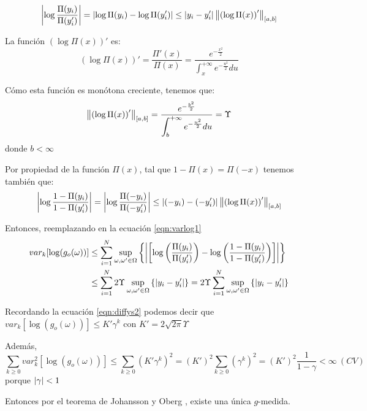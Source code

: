 \begin{equation}
    \left|\log \frac{\Pi(y_i)}{\Pi(y_i')}\right| = \left|\log \Pi(y_i)  -\log \Pi(y_i')\right| \leq \left|y_i-y_i'\right| \left\lVert\left(\log \Pi(x)\right)'\right\rVert_{[a,b]}
\end{equation}


La función $(\log \Pi(x))'$ es:
\begin{equation}
    (\log \Pi(x))' = \frac{\Pi'(x)}{\Pi(x)} = \frac{e^{-\frac{x^2}{2}}}{\displaystyle \int_x^{+\infty}e^{-\frac{u^2}{2}}du}
\end{equation}

Cómo esta función es monótona creciente, tenemos que:
\begin{equation}
    \left\lVert\left(\log \Pi(x)\right)'\right\rVert_{[a,b]} = \frac{e^{-\frac{b^2}{2}}}{\displaystyle \int_b^{+\infty}e^{-\frac{u^2}{2}}du} = \Upsilon
\end{equation}
donde $b<\infty$

Por propiedad de la función $\Pi(x)$, tal que $1-\Pi(x)=\Pi(-x)$ tenemos también que:
\begin{equation}
    \left|\log \frac{1-\Pi(y_i)}{1-\Pi(y_i')}\right| = 
    \left|\log \frac{\Pi(-y_i)}{\Pi(-y_i')}\right|  \leq \left|(-y_i)-(-y_i')\right| \left\lVert\left(\log \Pi(x)\right)'\right\rVert_{[a,b]}
\end{equation}

Entonces, reemplazando en la ecuación \eqref{eqn:varlog1}
\begin{align*}
  var_k[\log(g_o(\omega))] & \leq \sum_{i=1}^N \sup_{\omega,\omega' \in \Omega} \left\{  \left| \left[ \log\left(\frac{\Pi(y_i)}{\Pi(y_i')}\right) - \log\left(\frac{1-\Pi(y_i)}{1-\Pi(y_i')}\right) \right]\right| \right\} \\
  & \leq \sum_{i=1}^N 2 \Upsilon \sup_{\omega,\omega' \in \Omega} \left\{  \left|y_i-y_i'\right| \right\} = 2 \Upsilon  \sum_{i=1}^N \sup_{\omega,\omega' \in \Omega} \left\{  \left|y_i-y_i'\right| \right\}
\end{align*}

Recordando la ecuación \eqref{eqn:diffys2} podemos decir que $var_k[\log(g_o(\omega))] \leq K' \gamma^k$ con $K'=2 \sqrt{2 \pi} \Upsilon$

Además,
\begin{equation*}
    \sum_{k\geq 0} var^2_k[\log(g_o(\omega))] \leq \sum_{k\geq 0} (K' \gamma^k)^2 =(K')^2 \sum_{k\geq 0} (\gamma^k)^2 = (K')^2 \frac{1}{1-\gamma} < \infty \  (CV)
\end{equation*}
porque $\left|\gamma\right|<1$

Entonces por el teorema de Johansson y Oberg \cite{johansson_square_2003}, existe una única $g$-medida.
